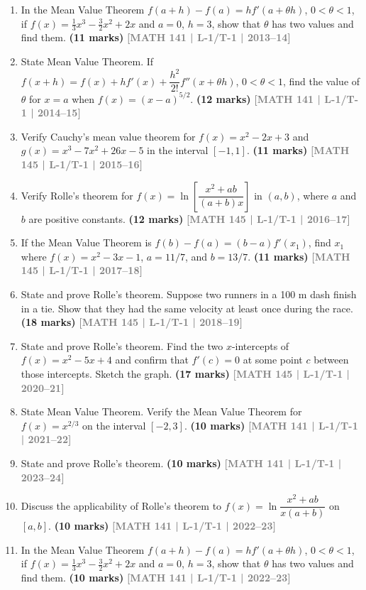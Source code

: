 \documentclass[12pt,a4paper]{article}
\newcommand{\yr}[1]{\hfill\textcolor{gray}{\small\textbf{[#1]}}}
\newcommand{\mk}[1]{\textcolor{orange!70!black}{\small\textbf{(#1 marks)}}}
\begin{document}
\begin{enumerate}
\item In the Mean Value Theorem $f(a+h)-f(a)=hf'(a+\theta h)$, $0<\theta<1$, if $f(x)=\tfrac{1}{3}x^{3}-\tfrac{3}{2}x^{2}+2x$ and $a=0$, $h=3$, show that $\theta$ has two values and find them.
\mk{11} \yr{MATH 141 | L-1/T-1 | 2013--14}

\item State Mean Value Theorem. If $f(x+h)=f(x)+hf'(x)+\dfrac{h^{2}}{2!}f''(x+\theta h)$, $0<\theta<1$, find the value of $\theta$ for $x=a$ when $f(x)=(x-a)^{5/2}$.
\mk{12} \yr{MATH 141 | L-1/T-1 | 2014--15}

\item Verify Cauchy's mean value theorem for $f(x)=x^{2}-2x+3$ and $g(x)=x^{3}-7x^{2}+26x-5$ in the interval $[-1,1]$.
\mk{11} \yr{MATH 145 | L-1/T-1 | 2015--16}

\item Verify Rolle's theorem for $f(x)=\ln\!\left[\dfrac{x^{2}+ab}{(a+b)x}\right]$ in $(a,b)$, where $a$ and $b$ are positive constants.
\mk{12} \yr{MATH 145 | L-1/T-1 | 2016--17}

\item If the Mean Value Theorem is $f(b)-f(a)=(b-a)f'(x_{1})$, find $x_{1}$ where $f(x)=x^{2}-3x-1$, $a=11/7$, and $b=13/7$.
\mk{11} \yr{MATH 145 | L-1/T-1 | 2017--18}

\item State and prove Rolle's theorem. Suppose two runners in a 100 m dash finish in a tie. Show that they had the same velocity at least once during the race.
\mk{18} \yr{MATH 145 | L-1/T-1 | 2018--19}

\item State and prove Rolle's theorem. Find the two $x$-intercepts of $f(x)=x^{2}-5x+4$ and confirm that $f'(c)=0$ at some point $c$ between those intercepts. Sketch the graph.
\mk{17} \yr{MATH 145 | L-1/T-1 | 2020--21}

\item State Mean Value Theorem. Verify the Mean Value Theorem for $f(x)=x^{2/3}$ on the interval $[-2,3]$.
\mk{10} \yr{MATH 141 | L-1/T-1 | 2021--22}

\item State and prove Rolle's theorem.
\mk{10} \yr{MATH 141 | L-1/T-1 | 2023--24}

\item Discuss the applicability of Rolle's theorem to $f(x)=\ln\!\dfrac{x^{2}+ab}{x(a+b)}$ on $[a,b]$.
\mk{10} \yr{MATH 141 | L-1/T-1 | 2022--23}

\item In the Mean Value Theorem $f(a+h)-f(a)=hf'(a+\theta h)$, $0<\theta<1$, if $f(x)=\tfrac{1}{3}x^{3}-\tfrac{3}{2}x^{2}+2x$ and $a=0$, $h=3$, show that $\theta$ has two values and find them.
\mk{10} \yr{MATH 141 | L-1/T-1 | 2022--23}



\end{enumerate}
\end{document}

